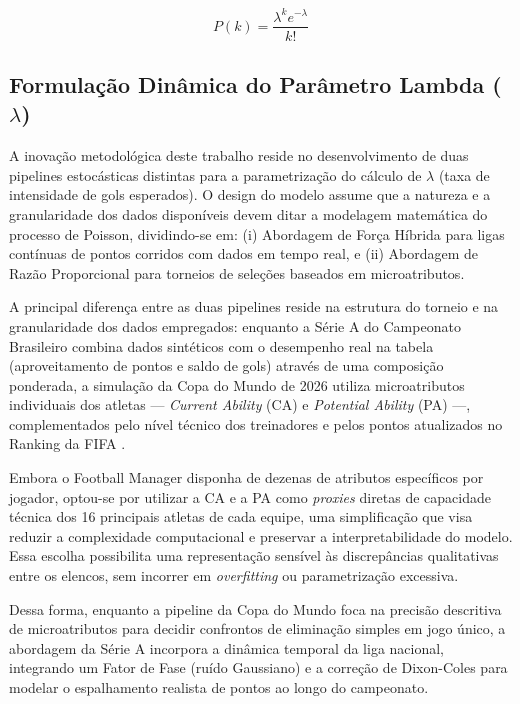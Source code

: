 \documentclass[12pt]{article}
\begin{document}
\begin{equation}
P(k) = \frac{\lambda^k e^{-\lambda}}{k!}
\label{eq:poisson}
\end{equation}

\subsection{Formulação Dinâmica do Parâmetro Lambda ($\lambda$)}

A inovação metodológica deste trabalho reside no desenvolvimento de duas pipelines estocásticas distintas para a parametrização do cálculo de $\lambda$ (taxa de intensidade de gols esperados). O design do modelo assume que a natureza e a granularidade dos dados disponíveis devem ditar a modelagem matemática do processo de Poisson, dividindo-se em: (i) Abordagem de Força Híbrida para ligas contínuas de pontos corridos com dados em tempo real, e (ii) Abordagem de Razão Proporcional para torneios de seleções baseados em microatributos. 

A principal diferença entre as duas pipelines reside na estrutura do torneio e na granularidade dos dados empregados: enquanto a Série A do Campeonato Brasileiro combina dados sintéticos com o desempenho real na tabela (aproveitamento de pontos e saldo de gols) através de uma composição ponderada, a simulação da Copa do Mundo de 2026 utiliza microatributos individuais dos atletas — \textit{Current Ability} (CA) e \textit{Potential Ability} (PA) —, complementados pelo nível técnico dos treinadores e pelos pontos atualizados no Ranking da FIFA \cite{band2026ranking}. 

Embora o Football Manager disponha de dezenas de atributos específicos por jogador, optou-se por utilizar a CA e a PA como \textit{proxies} diretas de capacidade técnica dos 16 principais atletas de cada equipe, uma simplificação que visa reduzir a complexidade computacional e preservar a interpretabilidade do modelo. Essa escolha possibilita uma representação sensível às discrepâncias qualitativas entre os elencos, sem incorrer em \textit{overfitting} ou parametrização excessiva. 

Dessa forma, enquanto a pipeline da Copa do Mundo foca na precisão descritiva de microatributos para decidir confrontos de eliminação simples em jogo único, a abordagem da Série A incorpora a dinâmica temporal da liga nacional, integrando um Fator de Fase (ruído Gaussiano) e a correção de Dixon-Coles \cite{dixon1997} para modelar o espalhamento realista de pontos ao longo do campeonato.
\end{document}
